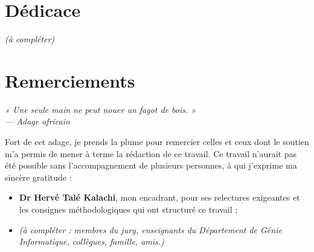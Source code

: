 \chapter*{Dédicace}
\vspace*{3cm}
\begin{center}\Large\color{navy}\emph{(à compléter)}\end{center}

\chapter*{Remerciements}
\begin{flushright}\itshape
« Une seule main ne peut nouer un fagot de bois. »\\
\upshape\small --- Adage africain
\end{flushright}
\vspace{0.5em}
Fort de cet adage, je prends la plume pour remercier celles et ceux dont le soutien m'a permis de mener à terme la rédaction de ce travail. Ce travail n'aurait pas été possible sans l'accompagnement de plusieurs personnes, à qui j'exprime ma sincère gratitude :
\begin{itemize}
\item \textbf{Dr Hervé Talé Kalachi}, mon encadrant, pour ses relectures exigeantes et les consignes méthodologiques qui ont structuré ce travail ;
\item \emph{(à compléter : membres du jury, enseignants du Département de Génie Informatique, collègues, famille, amis.)}
\end{itemize}



